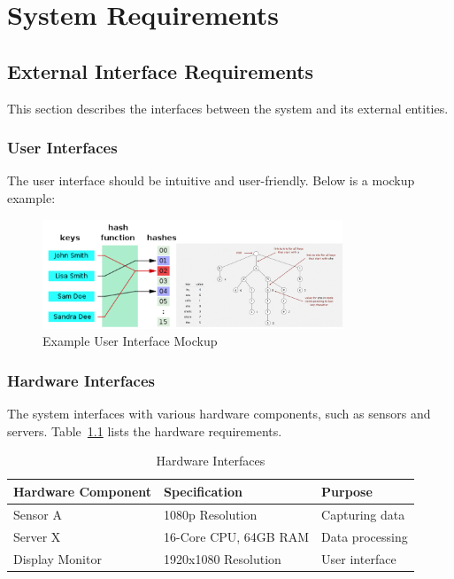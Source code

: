 \chapter{System Requirements}
\label{ch:system_requirements}

\section{External Interface Requirements}
This section describes the interfaces between the system and its external entities.

\subsection{User Interfaces}
The user interface should be intuitive and user-friendly. Below is a mockup example:

\begin{figure}[h]
    \centering
    \includegraphics[width=0.8\textwidth]{images/hashing.png}
    \caption{Example User Interface Mockup}
    \label{fig:ui_mockup}
\end{figure}

\subsection{Hardware Interfaces}
The system interfaces with various hardware components, such as sensors and servers. Table~\ref{tab:hardware_interfaces} lists the hardware requirements.

\begin{table}[h]
    \centering
    \begin{tabular}{|l|l|l|}
        \hline
        \textbf{Hardware Component} & \textbf{Specification} & \textbf{Purpose} \\ \hline
        Sensor A & 1080p Resolution & Capturing data \\ \hline
        Server X & 16-Core CPU, 64GB RAM & Data processing \\ \hline
        Display Monitor & 1920x1080 Resolution & User interface \\ \hline
    \end{tabular}
    \caption{Hardware Interfaces}
    \label{tab:hardware_interfaces}
\end{table}

